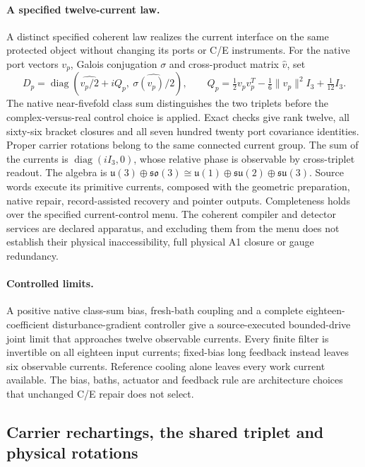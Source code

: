 \documentclass[11pt]{article}
\begin{document}
\paragraph{A specified twelve-current law.}
A distinct specified coherent law realizes the current interface on the same
protected object without changing its ports or C/E instruments. For the
native port vectors \(v_p\), Galois conjugation \(\sigma\) and cross-product
matrix \(\widehat v\), set
\[
 D_p=\operatorname{diag}\left(
 \widehat{v_p/2}+iQ_p,\ \widehat{\sigma(v_p)/2}\right),
 \qquad Q_p=\tfrac12v_pv_p^T-\tfrac16\lVert v_p\rVert^2I_3+
 \tfrac1{12}I_3.
\]
The native near-fivefold class sum distinguishes the two triplets before the
complex-versus-real control choice is applied. Exact checks give rank
twelve, all sixty-six bracket closures and all seven hundred twenty port
covariance identities. Proper carrier rotations belong to the same connected
current group. The sum of the currents is \(\operatorname{diag}(iI_3,0)\),
whose relative phase is observable by cross-triplet readout. The algebra is
\(\mathfrak u(3)\oplus\mathfrak{so}(3)\cong\mathfrak u(1)\oplus
\mathfrak{su}(2)\oplus\mathfrak{su}(3)\). Source words execute its primitive
currents, composed with the geometric preparation, native repair,
record-assisted recovery and pointer outputs. Completeness holds over the
specified current-control menu. The coherent compiler and detector services
are declared apparatus, and excluding them from the menu does not establish
their physical inaccessibility, full physical A1 closure or gauge
redundancy.

\paragraph{Controlled limits.}
A positive native class-sum bias, fresh-bath coupling and a complete
eighteen-coefficient disturbance-gradient controller give a source-executed
bounded-drive joint limit that approaches twelve observable currents. Every
finite filter is invertible on all eighteen input currents; fixed-bias long
feedback instead leaves six observable currents. Reference cooling alone
leaves every work current available. The bias, baths, actuator and feedback
rule are architecture choices that unchanged C/E repair does not select.

\subsection{Carrier rechartings, the shared triplet and physical rotations}
\label{sec:carrier-rotations}
\end{document}
